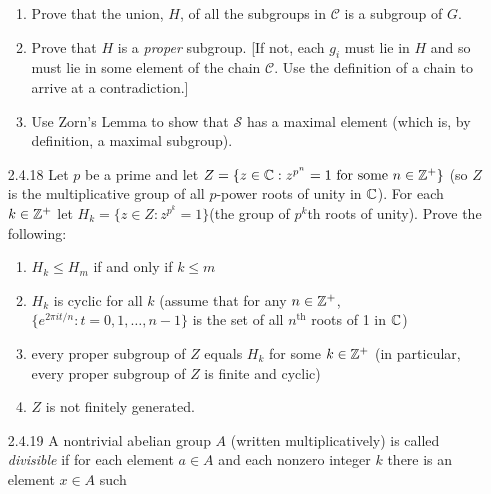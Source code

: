 \begin{enumerate}
\begin{enumerate}
                     \item Prove that the union, $H$, of all the subgroups in
                           $\mathcal{C}$ is a subgroup of $G$.
                     \item Prove that $H$ is a \textit{proper} subgroup. [If
                           not, each $g_i$ must lie in $H$ and so must lie in
                           some element of the chain $\mathcal{C}$. Use the
                           definition of a chain to arrive at a contradiction.]
                     \item Use Zorn's Lemma to show that $\mathcal{S}$ has a
                           maximal element (which is, by definition, a maximal
                           subgroup).
                  \end{enumerate}
   \item[2.4.18]  Let $p$ be a prime and let
                  $Z = \{z \in \mathbb{C} : z^{p^n} = 1 \text{ for some } n \in \mathbb{Z}^+\}$
                  (so $Z$ is the multiplicative group of all $p$-power roots of
                  unity in $\mathbb{C}$). For each $k \in \mathbb{Z}^+$ let
                  $H_k = \{z \in Z : z^{p^k} = 1\}$(the group of $p^k$th roots
                  of unity). Prove the following:
                  \begin{enumerate}
                     \item $H_k \le H_m$ if and only if $k \le m$
                     \item $H_k$ is cyclic for all $k$ (assume that for any
                           $n \in \mathbb{Z}^+$, $\{e^{2\pi it/n}:t =0,1,\ldots, n-1\}$
                           is the set of all $n^{\text{th}}$ roots of 1 in
                           $\mathbb{C}$)
                     \item every proper subgroup of $Z$ equals $H_k$ for some
                           $k \in \mathbb{Z}^+$ (in particular, every proper subgroup of
                           $Z$ is finite and cyclic)
                     \item $Z$ is not finitely generated.
                  \end{enumerate}
   \item[2.4.19]  A nontrivial abelian group $A$ (written multiplicatively) is
                  called \textit{divisible} if for each element $a \in A$ and
                  each nonzero integer $k$ there is an element $x \in A$ such

\end{enumerate}
